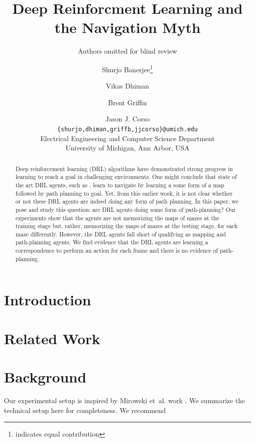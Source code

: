 \documentclass[letterpaper]{article} %
\title{Deep Reinforcment Learning and the Navigation Myth}
\author{Authors omitted for blind review}
\author{Shurjo Banerjee\thanks{indicates equal contribution}
  \and Vikas Dhiman\footnotemark[1]
  \and Brent Griffin
  \and Jason J. Corso\\
  \texttt{\{shurjo,dhiman,griffb,jjcorso\}@umich.edu}
\\Electrical Engineering and Computer Science Department
\\University of Michigan, Ann Arbor, USA
}
\newcommand{\etal}{et~al.}
\begin{document}
\maketitle
\begin{abstract}

Deep reinforcement learning (DRL) algorithms have demonstrated strong progress in learning to reach a goal in challenging environments.  One might conclude that state of the art DRL agents, such as \cite{MiPaViICLR2017}, learn to navigate by learning a some form of a map followed by path planning to goal.  Yet, from this earlier work, it is not clear whether or not these DRL agents are indeed doing any form of path planning.  In this paper, we pose and study this question: are DRL agents doing some form of path-planning?  Our experiments show that the agents are not memorizing the maps of mazes at the training stage but, rather, memorizing the maps of mazes at the testing stage, for each maze differently.  However, the DRL agents fall short of qualifying as mapping and path-planning agents.  We find evidence that the DRL agents are learning a correspondence to perform an action for each frame and there is no evidence of path-planning.

\end{abstract}
\section{Introduction}
%
%

 
\section{Related Work}
%


\section{Background}
\label{sec:background}
Our experimental setup is inspired by Mirowski \etal{} work \cite{MiPaViICLR2017}. We summarize the technical setup here for completeness. We recommend \cite{MnBaMiICML2016,MnBaMiICML2016,MiPaViICLR2017}
\end{document}
